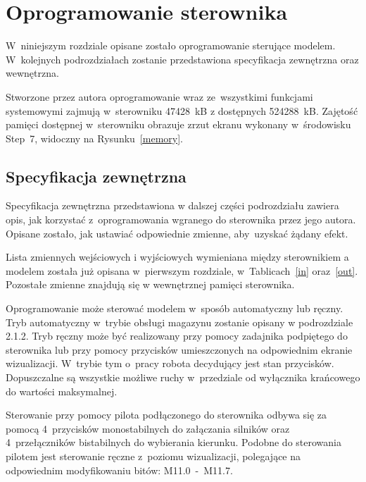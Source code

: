 \section{Oprogramowanie sterownika}
W~niniejszym rozdziale opisane zostało oprogramowanie sterujące modelem. W~kolejnych podrozdziałach zostanie przedstawiona specyfikacja zewnętrzna oraz wewnętrzna. 

Stworzone przez autora oprogramowanie wraz ze~wszystkimi funkcjami systemowymi zajmują w~sterowniku 47428~kB z dostępnych 524288~kB. Zajętość pamięci dostępnej w~sterowniku obrazuje zrzut ekranu wykonany w~środowisku Step~7, widoczny na Rysunku~\ref{memory}.

\subsection{Specyfikacja zewnętrzna}
Specyfikacja zewnętrzna przedstawiona w dalszej części podrozdziału zawiera opis, jak korzystać z~oprogramowania wgranego do sterownika przez jego autora. Opisane zostało, jak ustawiać odpowiednie zmienne, aby~uzyskać żądany efekt.

Lista zmiennych wejściowych i wyjściowych wymieniana między sterownikiem a modelem została już opisana w~pierwszym rozdziale, w~Tablicach~\ref{in} oraz~\ref{out}. Pozostałe zmienne znajdują się w wewnętrznej pamięci sterownika.

Oprogramowanie może sterować modelem w~sposób automatyczny lub ręczny. Tryb automatyczny w~trybie obsługi magazynu zostanie opisany w podrozdziale 2.1.2. Tryb ręczny może być realizowany przy pomocy zadajnika podpiętego do sterownika lub przy pomocy przycisków umieszczonych na odpowiednim ekranie wizualizacji. W~trybie tym o~pracy robota decydujący jest stan przycisków. Dopuszczalne są wszystkie możliwe ruchy w~przedziale od wyłącznika krańcowego do wartości maksymalnej.

Sterowanie przy pomocy pilota podłączonego do sterownika odbywa się za pomocą 4~przycisków monostabilnych do załączania silników oraz 4~przełączników bistabilnych do wybierania kierunku. Podobne do sterowania pilotem jest sterowanie ręczne z~poziomu wizualizacji, polegające na odpowiednim modyfikowaniu bitów: M11.0~-~M11.7.

